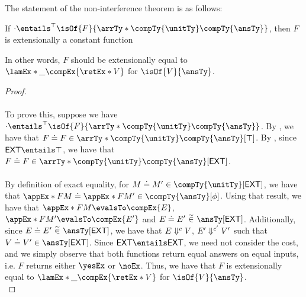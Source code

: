 \documentclass[letterpaper]{article}
\newcommand{\EXT}{\textsf{EXT}}
\begin{document}
The statement of the non-interference theorem is as follows:
\begin{theorem}\label{thm:non-int}
    If $\cdot \entailsPhase{\top} \isOf{F}{\arrTy*{\compTy{\unitTy}}{\compTy{\ansTy}}}$, then $F$ is extensionally a constant function
\end{theorem}

In other words, $F$ should be extensionally equal to $\lamEx*{\_}{\compEx{\retEx*{V}}}$ for $\isOf{V}{\ansTy}$.

\begin{proof}\phantom{nextline}\\\\
To prove this, suppose we have $\cdot \entailsPhase{\top} \isOf{F}{\arrTy*{\compTy{\unitTy}}{\compTy{\ansTy}}}$. By , we have that $\exEqOfPhase{F}{F}{\arrTy*{\compTy{\unitTy}}{\compTy{\ansTy}}}{\top}$.
By , since $\EXT \entails \top$, we have that $\exEqOfPhase{F}{F}{\arrTy*{\compTy{\unitTy}}{\compTy{\ansTy}}}{\EXT}$.\\\\
By definition of exact equality, for $\exEqOfPhase{M}{M'}{\compTy{\unitTy}}{\EXT}$, we have that $\exEqOfPhase{\appEx*{F}{M}}{\appEx*{F}{M'}}{\compTy{\ansTy}}{\phi}$. 
Using that result, we have that $\appEx*{F}{M} \evalsTo \compEx{E}$, $\appEx*{F}{M'} \evalsTo \compEx{E'}$ and $\compEqOfPhase{E}{E'}{\ansTy}{\EXT}$. Additionally, since $\compEqOfPhase{E}{E'}{\ansTy}{\EXT}$, we have that 
$E \Downarrow^{c} V$, $E' \Downarrow^{c'} V'$ such that $\exEqOfPhase{V}{V'}{\ansTy}{\EXT}$. Since $\EXT \entails \EXT$, we need not consider the cost, and we simply observe that
both functions return equal answers on equal inputs, i.e. $F$ returns either $\yesEx$ or $\noEx$. Thus, we have that $F$ is extensionally equal to $\lamEx*{\_}{\compEx{\retEx*{V}}}$ for $\isOf{V}{\ansTy}$.\\
\end{proof}
\end{document}
